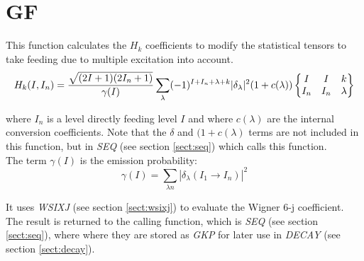 \section{GF}
\label{sect:gf}

\noindent This function calculates the $H_k$ coefficients to modify the
statistical tensors to take feeding due to multiple excitation into
account.\\

\begin{equation}
H_k(I, I_n) =
{\sqrt{(2 I + 1) (2 I_n + 1)} \over \gamma(I)}
\sum_\lambda (-1)^{I + I_n + \lambda + k}
|\delta_\lambda|^2
(1 + c(\lambda))
\begin{Bmatrix}
I & I & k\\
I_n & I_n & \lambda
\end{Bmatrix}
\end{equation}

\noindent where $I_n$ is a level directly feeding level $I$ and where
$c(\lambda)$ are the internal conversion coefficients. Note that the
$\delta$ and $(1 + c(\lambda)$ terms are not included in this function, but
in {\em SEQ} (see section \ref{sect:seq}) which calls this function.\\

\noindent The term $\gamma(I)$ is the emission probability:\\

\begin{equation}
\gamma(I) =
\sum_{\lambda n} | \delta_\lambda(I_1 \rightarrow I_n)|^2
\end{equation}

\noindent It uses {\em WSIXJ} (see section \ref{sect:wsixj}) to evaluate
the Wigner 6-j coefficient.\\

\noindent The result is returned to the calling function, which is {\em SEQ}
(see section \ref{sect:seq}), where where they are stored as {\em GKP} for
later use in {\em DECAY} (see section \ref{sect:decay}).\\
